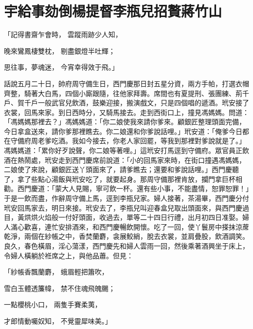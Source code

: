 %

\chapter{宇給事劾倒楊提督\KG 李瓶兒招贅蔣竹山}

\begin{showcontents}{}



「記得書齋乍會時，  雲蹤雨跡少人知，

晚來鸞鳳棲雙枕，  剔盡銀燈半吐輝；

思往事，夢魂迷，  今宵幸得效于飛。」

話說五月二十日，帥府周守備生日，西門慶那日封五星分資，兩方手帕，打選衣帽齊整，騎著大白馬，四個小廝跟隨，往他家拜壽。席間也有夏提刑、張團練、荊千戶、賀千戶一般武官兒飲酒，鼓樂迎接，搬演戲文，只是四個唱的遞酒。玳安接了衣裳，回馬來家。到日西時分，又騎馬接去。走到西街口上，撞見馮媽媽。問道：「馮媽媽那裡去？」馮媽媽道：「你二娘使我來請你爹來。顧銀匠整理頭面完備，今日拿盒送來，請你爹那裡瞧去。你二娘還和你爹說話哩。」玳安道：「俺爹今日都在守備府周老爹吃酒。我如今接去，你老人家回罷，等我到那裡對爹說就是了。」馮媽媽道：「累你好歹說聲，你二娘等著哩。」這玳安打馬逕到守備府。眾官員正飲酒在熱鬧處，玳安走到西門慶席前說道：「小的回馬家來時，在街口撞遇馮媽媽，二娘使了來說，顧銀匠送丫頭面來了，請爹瞧去；還要和爹說話哩。」西門慶聽了，拿了些點心湯飯與玳安吃了，就要起身。那周守備那裡肯放，攔門拿巨杯相勸。西門慶道：「蒙大人見賜，寧可飲一杯。還有些小事，不能盡情，恕罪恕罪！」于是一飲而盡，作辭周守備上馬，逕到李瓶兒家。婦人接著，茶湯畢，西門慶分付玳安回馬家去，明日來接。玳安去了，李瓶兒叫迎春盒兒取出頭面來，與西門慶過目，黃烘烘火焰般一付好頭面，收過去，單等二十四日行禮，出月初四日准娶。婦人滿心歡喜，連忙安排酒來，和西門慶暢飲開懷。吃了一回，使丫鬟房中搽抹涼蓆乾淨，兩個在紗帳之中，香焚蘭麝，衾展鮫綃，脫去衣裳，並肩疊股，飲酒調笑。良久，春色橫眉，淫心蕩漾，西門慶先和婦人雲雨一回，然後乘著酒興坐于床上，令婦人橫躺於袵席之上，與他品蕭。但見：

「紗帳香飄蘭麝，  蛾眉輕把簫吹，

雪白玉體透簾幃，  禁不住魂飛魄颺；

一點櫻桃小口，  兩隻手賽柔荑，

才郎情動囑奴知，  不覺靈犀味美。」


\end{showcontents}

